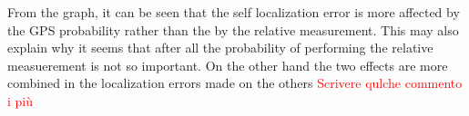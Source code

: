 From the graph, it can be seen that the self localization error is more affected by the GPS probability rather than the by the relative measurement. This may also explain why it seems that after all the probability of performing the relative measuerement is not so important. On the other hand the two effects are more combined in the localization errors made on the others \textcolor{red}{Scrivere qulche commento i più}